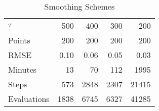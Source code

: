 \begin{table}\onehalfspacing
\begin{center}
\begin{threeparttable}
  \captionsetup{width=30cm}
  \caption{Smoothing Schemes}
  \label{Smoothing Schemes}
  \begin{tabular}{lrrrr}\toprule
  $\tau$ & 500 &  400 &   300 & 200 \\
  Points      & 200 & 200 & 200  & 200 \\
  \midrule
  RMSE        & 0.10 &   0.06 &    0.05 &  0.03  \\
  Minutes     &  13 &      70 &    112 &   1995 \\
  Steps       &  573 &   2848 &    2307 &  21415 \\
  Evaluations & 1838 &   6745 &    6327 &  41285 \\
  \bottomrule
  \end{tabular}
  \end{threeparttable}
  \end{center}
\end{table}
